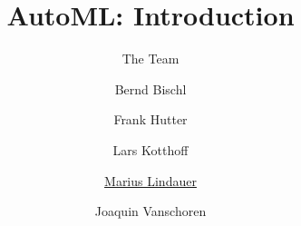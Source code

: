 




\title[AutoML: Big Picture]{AutoML: Introduction}
\subtitle{The Team}
\author[Marius Lindauer]{Bernd Bischl \and Frank Hutter \and Lars Kotthoff\newline \and \underline{Marius Lindauer} \and Joaquin Vanschoren}
\institute{}
\date{}





	
	\maketitle
	

